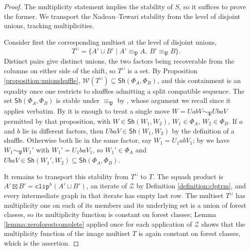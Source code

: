 \documentclass{amsart}
\theoremstyle{definition}
\theoremstyle{remark}
\numberwithin{equation}{subsection}
\newcommand{\zeromap}{\mathcal{Z}}
\newcommand{\clp}{\mathtt{clip}}
\newcommand{\forest}{\mathfrak{P}}
\begin{document}
\begin{proof}
The multiplicity statement implies the stability of $S$, so it suffices to prove the former. We transport the Nadeau--Tewari stability from the level of disjoint unions, tracking multiplicities.

Consider first the corresponding multiset at the level of disjoint unions,
$$T^{\sqcup}=\{A'\sqcup B'\mid A'\equiv_\forest A,\ B'\equiv_\forest B\}.$$
Distinct pairs give distinct unions, the two factors being recoverable from the columns on either side of the shift, so $T^{\sqcup}$ is a set. By Proposition \ref{proposition:unionshuffle}, $\mathcal{W}(T^{\sqcup})\subseteq\mathsf{Sh}(\Phi_A,\Phi_B)$, and this containment is an equality once one restricts to shuffles admitting a split compatible sequence. The set $\mathsf{Sh}(\Phi_A,\Phi_B)$ is stable under $\equiv_\forest$ by \cite[Theorem~6.3]{nadeau2024forest}, whose argument we recall since it applies verbatim. By \cite[Proposition~5.8]{nadeau2024forest} it is enough to treat a single move $W=UabV\sim_\forest UbaV$ permitted by that proposition, with $W\in\mathsf{Sh}(W_1,W_2)$, $W_1\in\Phi_A$, $W_2\in\Phi_B$. If $a$ and $b$ lie in different factors, then $UbaV\in\mathsf{Sh}(W_1,W_2)$ by the definition of a shuffle. Otherwise both lie in the same factor, say $W_1=U_1abV_1$; by \cite[Lemma~5.9]{nadeau2024forest} we have $W_1\sim_\forest W_1'$ with $W_1'=U_1baV_1$, so $W_1'\in\Phi_A$ and $UbaV\in\mathsf{Sh}(W_1',W_2)\subseteq\mathsf{Sh}(\Phi_A,\Phi_B)$.

It remains to transport this stability from $T^{\sqcup}$ to $T$. The squash product is $A'\boxtimes B'=\clp^{h}(A'\sqcup B')$, an iterate of $\zeromap$ by Definition \ref{definition:clptrm}, and every intermediate graph in that iterate has empty last row. The multiset $T^{\sqcup}$ has multiplicity one on each of its members and its underlying set is a union of forest classes, so its multiplicity function is constant on forest classes; Lemma \ref{lemma:zeroforestcomplete} applied once for each application of $\zeromap$ shows that the multiplicity function of the image multiset $T$ is again constant on forest classes, which is the assertion.
\end{proof}
\end{document}

